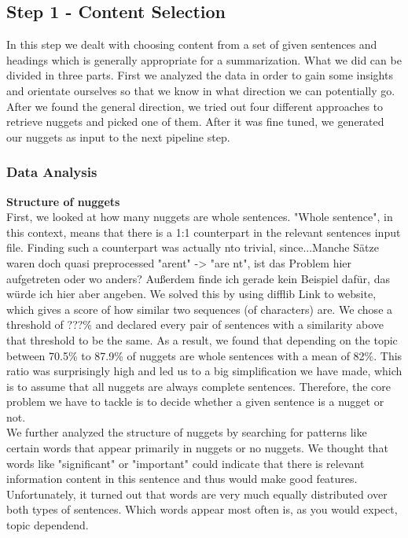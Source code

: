 
\subsection{Step 1 - Content Selection}
In this step we dealt with choosing content from a set of given sentences and headings which is generally appropriate for a summarization. What we did can be divided in three parts. First we analyzed the data in order to gain some insights and orientate ourselves so that we know in what direction we can potentially go. After we found the general direction, we tried out four different approaches to retrieve nuggets and picked one of them. After it was fine tuned, we generated our nuggets as input to the next pipeline step.
\subsubsection{Data Analysis}
\textbf{Structure of nuggets}\\
First, we looked at how many nuggets are whole sentences. "Whole sentence", in this context, means that there is a 1:1 counterpart in the relevant sentences input file. Finding such a counterpart was actually nto trivial, since...\lbrack Manche Sätze waren doch quasi preprocessed "arent" -> "are nt", ist das Problem hier aufgetreten oder wo anders? Außerdem finde ich gerade kein Beispiel dafür, das würde ich hier aber angeben\rbrack. We solved this by using difflib \lbrack Link to website\rbrack, which gives a score of how similar two sequences (of characters) are. We chose a threshold of ???\% and declared every pair of sentences with a similarity above that threshold to be the same. As a result, we found that depending on the topic between 70.5\% to 87.9\% of nuggets are whole sentences with a mean of 82\%. This ratio was surprisingly high and led us to a big simplification we have made, which is to assume that all nuggets are always complete sentences. Therefore, the core problem we have to tackle is to decide whether a given sentence is a nugget or not.\\
We further analyzed the structure of nuggets by searching for patterns like certain words that appear primarily in nuggets or no nuggets. We thought that words like "significant" or "important" could indicate that there is relevant information content in this sentence and thus would make good features. Unfortunately, it turned out that words are very much equally distributed over both types of sentences. Which words appear most often is, as you would expect, topic dependend.

